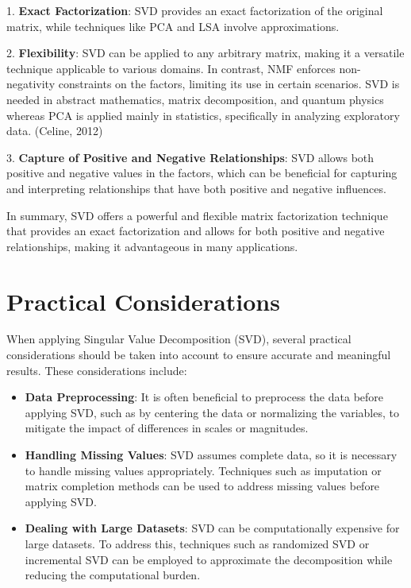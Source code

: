 \documentclass[a4paper]{article}
\begin{document}
{		1. \textbf{Exact Factorization}: SVD provides an exact factorization of the original matrix, while techniques like PCA and LSA involve approximations.
		
		2. \textbf{Flexibility}: SVD can be applied to any arbitrary matrix, making it a versatile technique applicable to various domains. In contrast, NMF enforces non-negativity constraints on the factors, limiting its use in certain scenarios. SVD is needed in abstract mathematics, matrix decomposition, and quantum physics whereas PCA is applied mainly in statistics, specifically in analyzing exploratory data. (Celine, 2012)
		
		3. \textbf{Capture of Positive and Negative Relationships}: SVD allows both positive and negative values in the factors, which can be beneficial for capturing and interpreting relationships that have both positive and negative influences.
		
		In summary, SVD offers a powerful and flexible matrix factorization technique that provides an exact factorization and allows for both positive and negative relationships, making it advantageous in many applications.
		
		\section{Practical Considerations}
		When applying Singular Value Decomposition (SVD), several practical considerations should be taken into account to ensure accurate and meaningful results. These considerations include:
		
		\begin{itemize}
			\item \textbf{Data Preprocessing}: It is often beneficial to preprocess the data before applying SVD, such as by centering the data or normalizing the variables, to mitigate the impact of differences in scales or magnitudes.
			
			\item \textbf{Handling Missing Values}: SVD assumes complete data, so it is necessary to handle missing values appropriately. Techniques such as imputation or matrix completion methods can be used to address missing values before applying SVD.
			
			\item \textbf{Dealing with Large Datasets}: SVD can be computationally expensive for large datasets. To address this, techniques such as randomized SVD or incremental SVD can be employed to approximate the decomposition while reducing the computational burden.
			

\end{itemize}}
\end{document}
